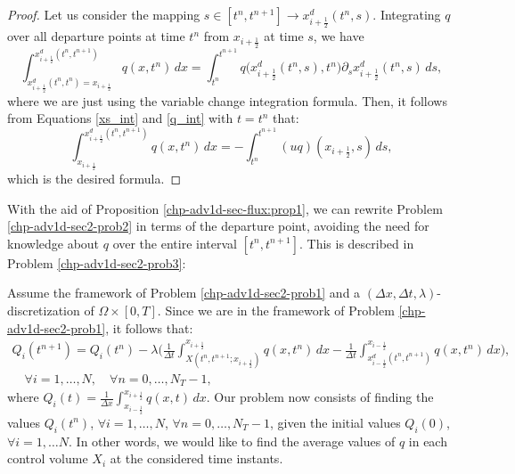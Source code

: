 \begin{proof}
	Let us consider the mapping $s\in[t^n,t^{n+1}] \to  x_{i+\frac{1}{2}}^d(t^n,s)$. 
	Integrating $q$ over all departure points at time $t^n$ from $x_{i+\frac{1}{2}}$ at time $s$, we have
	\begin{equation}
		\label{depint_1}
		\int^{ x_{i+\frac{1}{2}}^d(t^n,t^{n+1})}_{ x_{i+\frac{1}{2}}^d(t^n,t^{n}) = x_{i+\frac{1}{2}}}   
		q(x,t^n)\,dx 
		= \int_{t^n}^{t^{n+1}}  q\big( x_{i+\frac{1}{2}}^d(t^n,s),t^n\big){\partial_s}{ x_{i+\frac{1}{2}}^d} (t^n,s)\,ds,
	\end{equation}
	where we are just using the variable change integration formula.
	Then, it follows from Equations  \eqref{xs_int}
	and \eqref{q_int} with $t=t^n$ that:
	\begin{equation}
		\label{depint_2}
			\int^{ x_{i+\frac{1}{2}}^d(t^n,t^{n+1})}_{x_{i+\frac{1}{2}}} q(x,t^n)\,dx 
			= -\int_{t^n}^{t^{n+1}} ({u} q)(x_{i+\frac{1}{2}},s) \,ds, 
	\end{equation}
	which is the desired formula.
\end{proof}
With the aid of Proposition \ref{chp-adv1d-sec-flux:prop1}, we can rewrite Problem \ref{chp-adv1d-sec2-prob2}
in terms of the departure point, avoiding the need for knowledge about $q$ over the
entire interval $[t^n, t^{n+1}]$. This is described in Problem \ref{chp-adv1d-sec2-prob3}:
\begin{prob}
    \label{chp-adv1d-sec2-prob3}
	Assume the framework of Problem \ref{chp-adv1d-sec2-prob1}
    and a $(\Delta x, \Delta t, \lambda)$-discretization of $\Omega \times [0,T]$.
	Since we are in the framework of Problem \ref{chp-adv1d-sec2-prob1}, it follows that:
\begin{equation}
	\label{1d-fvslexact-scheme}
	\begin{split}
{Q}_i(t^{n+1}) =  {Q}_i(t^{n}) -
\lambda
\bigg( \frac{1}{\Delta t}\int_{X(t^n,t^{n+1};x_{i+\frac{1}{2}})}^{x_{i+\frac{1}{2}}}{q}(x, t^n) \,dx-
\frac{1}{\Delta t} \int_{x_{i-\frac{1}{2}}^d(t^n,t^{n+1})}^{x_{i-\frac{1}{2}}}{q}(x, t^n) \,dx \bigg),\\
\quad \forall i = 1, \ldots, N,
\quad \forall n = 0, \ldots, N_T-1,
	\end{split}
\end{equation}
	where ${Q}_i(t) = \frac{1}{\Delta x}
	\int_{x_{i-\frac{1}{2}}}^{x_{i+\frac{1}{2}}} {q}(x,t) \,dx$.
	Our problem now consists of finding the values ${Q}_i(t^{n})$, 
	$\forall i = 1, \ldots, N$, $\forall n = 0, \ldots, N_T-1$,
	given the initial values ${Q}_i(0)$, $\forall i = 1, \ldots N$.
	In other words, we would like to find the average values of ${q}$
	in each control volume $X_i$ at the considered time instants.
\end{prob}
